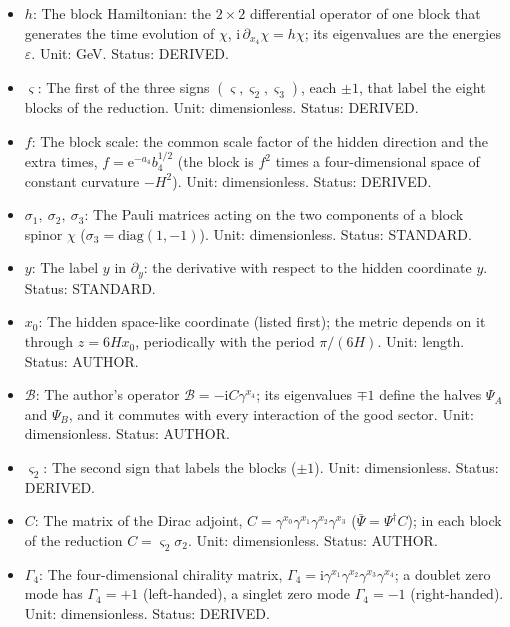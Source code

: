 \documentclass[
  10pt,
]{article}
\begin{document}
\begin{itemize}
  \(y\), \(\partial_{x_4}\) with respect to the time \(x_4\),
  \(\partial X/\partial Y\) the derivative of \(X\) with respect to
  \(Y\) at fixed other variables. Status: STANDARD.
\item
  \(h\): The block Hamiltonian: the \(2 \times 2\) differential operator
  of one block that generates the time evolution of \(\chi\),
  \(\mathrm{i}\,\partial_{x_4}\chi = h\chi\); its eigenvalues are the
  energies \(\varepsilon\). Unit: GeV. Status: DERIVED.
\item
  \(\varsigma\): The first of the three signs
  \((\varsigma, \varsigma_2, \varsigma_3)\), each \(\pm1\), that label
  the eight blocks of the reduction. Unit: dimensionless. Status:
  DERIVED.
\item
  \(f\): The block scale: the common scale factor of the hidden
  direction and the extra times, \(f = \mathrm{e}^{-a_4}b_4^{1/2}\) (the
  block is \(f^2\) times a four-dimensional space of constant curvature
  \(-H^2\)). Unit: dimensionless. Status: DERIVED.
\item
  \(\sigma_1,\ \sigma_2,\ \sigma_3\): The Pauli matrices acting on the
  two components of a block spinor \(\chi\)
  (\(\sigma_3 = \mathrm{diag}(1, -1)\)). Unit: dimensionless. Status:
  STANDARD.
\item
  \(y\): The label \(y\) in \(\partial_y\): the derivative with respect
  to the hidden coordinate \(y\). Status: STANDARD.
\item
  \(x_0\): The hidden space-like coordinate (listed first); the metric
  depends on it through \(z = 6Hx_0\), periodically with the period
  \(\pi/(6H)\). Unit: length. Status: AUTHOR.
\item
  \(\mathcal{B}\): The author's operator
  \(\mathcal{B} = -\mathrm{i}C\gamma^{x_4}\); its eigenvalues \(\mp1\)
  define the halves \(\Psi_A\) and \(\Psi_B\), and it commutes with
  every interaction of the good sector. Unit: dimensionless. Status:
  AUTHOR.
\item
  \(\varsigma_2\): The second sign that labels the blocks (\(\pm1\)).
  Unit: dimensionless. Status: DERIVED.
\item
  \(C\): The matrix of the Dirac adjoint,
  \(C = \gamma^{x_0}\gamma^{x_1}\gamma^{x_2}\gamma^{x_3}\)
  (\(\bar\Psi = \Psi^\dagger C\)); in each block of the reduction
  \(C = \varsigma_2\sigma_2\). Unit: dimensionless. Status: AUTHOR.
\item
  \(\Gamma_4\): The four-dimensional chirality matrix,
  \(\Gamma_4 = \mathrm{i}\gamma^{x_1}\gamma^{x_2}\gamma^{x_3}\gamma^{x_4}\);
  a doublet zero mode has \(\Gamma_4 = +1\) (left-handed), a singlet
  zero mode \(\Gamma_4 = -1\) (right-handed). Unit: dimensionless.
  Status: DERIVED.
\end{itemize}
\end{document}
